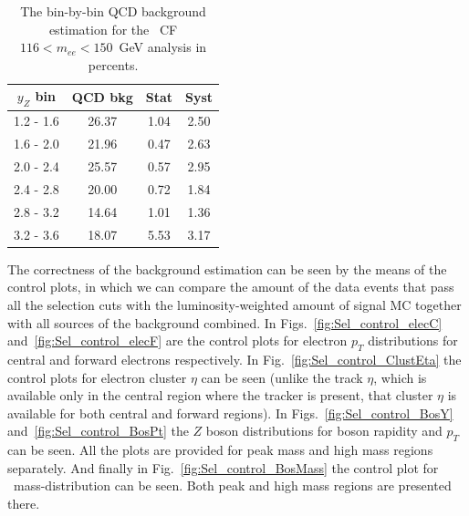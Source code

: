 \begin{table}
\centering
\begin{tabular}{ cccc } \hline \hline
 $y_Z$ bin & QCD bkg & Stat & Syst \\  \hline
 1.2 -  1.6 &  26.37 &   1.04  &   2.50 \\
 1.6 -  2.0 &  21.96 &   0.47  &   2.63 \\
 2.0 -  2.4 &  25.57 &   0.57  &   2.95 \\
 2.4 -  2.8 &  20.00 &   0.72  &   1.84 \\
 2.8 -  3.2 &  14.64 &   1.01  &   1.36 \\
 3.2 -  3.6 &  18.07 &   5.53  &   3.17 \\
\hline \hline
\end{tabular}
\caption{The bin-by-bin QCD background estimation for the \Zee\ CF $116 < m_{ee} < 150$~GeV analysis in percents.}
\label{tab:bkg_qcd_high_percents}
\end{table}

The correctness of the background estimation can be seen by the means of the control plots, in which we can compare the amount of the data events that pass all the selection cuts with the luminosity-weighted amount of signal MC together with all sources of the background combined. In Figs.~\ref{fig:Sel_control_elecC} and~\ref{fig:Sel_control_elecF} are the control plots for electron $p_T$ distributions for central and forward electrons respectively. In Fig.~\ref{fig:Sel_control_ClustEta} the control plots for electron cluster $\eta$ can be seen (unlike the track $\eta$, which is available only in the central region where the tracker is present, that cluster $\eta$ is available for both central and forward regions). In Figs.~\ref{fig:Sel_control_BosY} and~\ref{fig:Sel_control_BosPt} the $Z$ boson distributions for boson rapidity and $p_T$ can be seen. All the plots are provided for peak mass and high mass regions separately. And finally in Fig.~\ref{fig:Sel_control_BosMass} the control plot for \Zee\ mass-distribution can be seen. Both peak and high mass regions are presented there.


